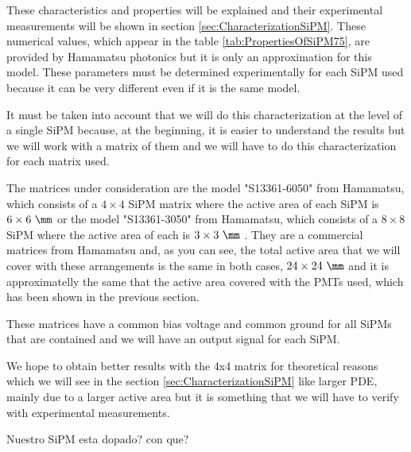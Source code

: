 These characteristics and properties will be explained and their experimental measurements will be shown in section \ref{sec:CharacterizationSiPM}. These numerical values, which appear in the table \ref{tab:PropertiesOfSiPM75}, are provided by Hamamatsu photonics but it is only an approximation for this model. These parameters must be determined experimentally for each SiPM used because it can be very different even if it is the same model.

It must be taken into account that we will do this characterization at the level of a single SiPM because, at the beginning, it is easier to understand the results but we will work with a matrix of them and we will have to do this characterization for each matrix used. 

The matrices under consideration are the model "S13361-6050" from Hamamatsu, which consists of a $4\times 4$ SiPM matrix where the active area of each SiPM is $6\times 6~\mm$ \cite{DataSheetHammamatsu_array_SiPM_6050} or the model "S13361-3050" from Hamamatsu, which consists of a $8\times 8$ SiPM where the active area of each is $3\times 3~\mm$ \cite{DataSheetHammamatsu_array_SiPM_3050}. They are a commercial matrices from Hamamatsu and, as you can see, the total active area that we will cover with these arrangements is the same in both cases, $24\times 24~\mm$ and it is approximatelly the same that the active area covered with the PMTs used, which has been shown in the previous section.

These matrices have a common bias voltage and common ground for all SiPMs that are contained and we will have an output signal for each SiPM. 

We hope to obtain better results with the 4x4 matrix for theoretical reasons which we will see in the section \ref{sec:CharacterizationSiPM} like larger PDE, mainly due to a larger active area but it is something that we will have to verify with experimental measurements.




Nuestro SiPM esta dopado? con que?